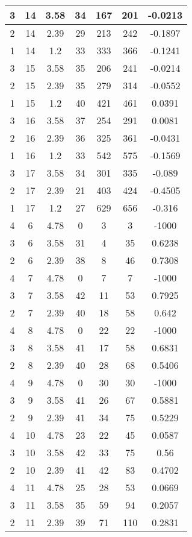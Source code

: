 \documentclass[letterpaper, 12pt]{article}
\begin{document}
\begin{longtable}{|c|c|c|c|c|c|c|}
\hline
3 & 14 & 3.58 & 34 & 167 & 201 & -0.0213 \\
\hline
2 & 14 & 2.39 & 29 & 213 & 242 & -0.1897 \\
\hline
1 & 14 & 1.2 & 33 & 333 & 366 & -0.1241 \\
\hline
3 & 15 & 3.58 & 35 & 206 & 241 & -0.0214 \\
\hline
2 & 15 & 2.39 & 35 & 279 & 314 & -0.0552 \\
\hline
1 & 15 & 1.2 & 40 & 421 & 461 & 0.0391 \\
\hline
3 & 16 & 3.58 & 37 & 254 & 291 & 0.0081 \\
\hline
2 & 16 & 2.39 & 36 & 325 & 361 & -0.0431 \\
\hline
1 & 16 & 1.2 & 33 & 542 & 575 & -0.1569 \\
\hline
3 & 17 & 3.58 & 34 & 301 & 335 & -0.089 \\
\hline
2 & 17 & 2.39 & 21 & 403 & 424 & -0.4505 \\
\hline
1 & 17 & 1.2 & 27 & 629 & 656 & -0.316 \\
\hline
4 & 6 & 4.78 & 0 & 3 & 3 & -1000 \\
\hline
3 & 6 & 3.58 & 31 & 4 & 35 & 0.6238 \\
\hline
2 & 6 & 2.39 & 38 & 8 & 46 & 0.7308 \\
\hline
4 & 7 & 4.78 & 0 & 7 & 7 & -1000 \\
\hline
3 & 7 & 3.58 & 42 & 11 & 53 & 0.7925 \\
\hline
2 & 7 & 2.39 & 40 & 18 & 58 & 0.642 \\
\hline
4 & 8 & 4.78 & 0 & 22 & 22 & -1000 \\
\hline
3 & 8 & 3.58 & 41 & 17 & 58 & 0.6831 \\
\hline
2 & 8 & 2.39 & 40 & 28 & 68 & 0.5406 \\
\hline
4 & 9 & 4.78 & 0 & 30 & 30 & -1000 \\
\hline
3 & 9 & 3.58 & 41 & 26 & 67 & 0.5881 \\
\hline
2 & 9 & 2.39 & 41 & 34 & 75 & 0.5229 \\
\hline
4 & 10 & 4.78 & 23 & 22 & 45 & 0.0587 \\
\hline
3 & 10 & 3.58 & 42 & 33 & 75 & 0.56 \\
\hline
2 & 10 & 2.39 & 41 & 42 & 83 & 0.4702 \\
\hline
4 & 11 & 4.78 & 25 & 28 & 53 & 0.0669 \\
\hline
3 & 11 & 3.58 & 35 & 59 & 94 & 0.2057 \\
\hline
2 & 11 & 2.39 & 39 & 71 & 110 & 0.2831 \\

\end{longtable}
\end{document}
